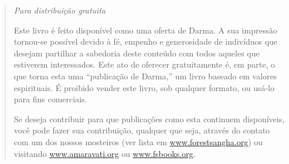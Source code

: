 \cleartoverso
\thispagestyle{empty}

\mbox{}

\vfill

\begin{quote}

{\centering\large\itshape
Para distribuição gratuita
\par}

\bigskip

Este livro é feito disponível como uma oferta de Darma. A sua impressão
tornou-se possível devido à fé, empenho e generosidade de indivíduos que desejam
partilhar a sabedoria deste conteúdo com todos aqueles que estiverem
interessados. Este ato de oferecer gratuitamente é, em parte, o que torna esta
uma ``publicação de Darma,'' um livro baseado em valores espirituais. É proibido
vender este livro, sob qualquer formato, ou usá-lo para fins comerciais.

\smallskip

Se deseja contribuir para que publicações como esta continuem disponíveis, você
pode fazer sua contribuição, qualquer que seja, através do contato com um dos
nossos mosteiros (ver lista em
\href{http://forestsangha.org}{www.forestsangha.org}) ou visitando
\href{http://amaravati.org}{www.amaravati.org} ou
\href{http://fsbooks.org}{www.fsbooks.org}.

\end{quote}

\vfill

\mbox{}

